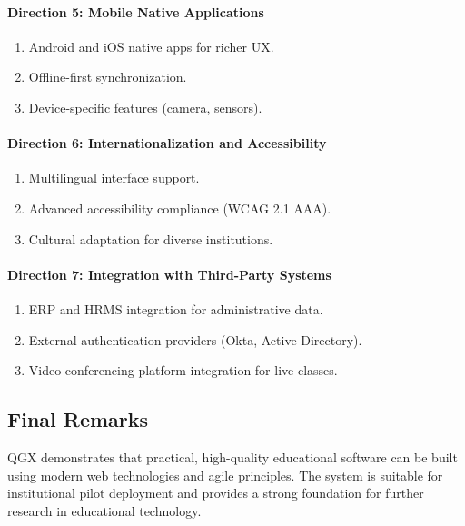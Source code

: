 \documentclass[11pt,a4paper]{article}
\begin{document}
\paragraph{Direction 5: Mobile Native Applications}

\begin{enumerate}
    \item Android and iOS native apps for richer UX.
    \item Offline-first synchronization.
    \item Device-specific features (camera, sensors).
\end{enumerate}

\paragraph{Direction 6: Internationalization and Accessibility}

\begin{enumerate}
    \item Multilingual interface support.
    \item Advanced accessibility compliance (WCAG 2.1 AAA).
    \item Cultural adaptation for diverse institutions.
\end{enumerate}

\paragraph{Direction 7: Integration with Third-Party Systems}

\begin{enumerate}
    \item ERP and HRMS integration for administrative data.
    \item External authentication providers (Okta, Active Directory).
    \item Video conferencing platform integration for live classes.
\end{enumerate}

\subsection{Final Remarks}

QGX demonstrates that practical, high-quality educational software can be built using modern web technologies and agile principles. The system is suitable for institutional pilot deployment and provides a strong foundation for further research in educational technology.
\end{document}
